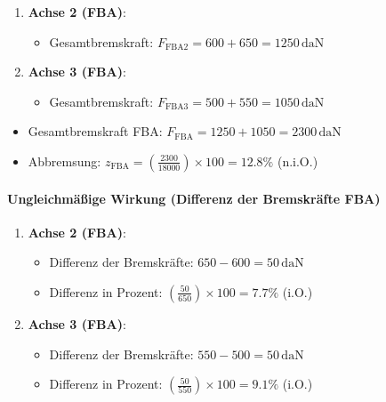 \documentclass{vorlage-design-main}
\begin{document}
\begin{enumerate}
\def\labelenumi{\arabic{enumi}.}

\item
  \textbf{Achse 2 (FBA)}:

  \begin{itemize}

  \item
    Gesamtbremskraft:
    $F_{\text{FBA2}} = 600 + 650 = 1250 \, \text{daN}$
  \end{itemize}
\item
  \textbf{Achse 3 (FBA)}:

  \begin{itemize}

  \item
    Gesamtbremskraft:
    $F_{\text{FBA3}} = 500 + 550 = 1050 \, \text{daN}$
  \end{itemize}
\end{enumerate}

\begin{itemize}

\item
  Gesamtbremskraft FBA:
  $F_{\text{FBA}} = 1250 + 1050 = 2300 \, \text{daN}$
\item
  Abbremsung:
  $z_{\text{FBA}} = \left( \frac{2300}{18000} \right) \times 100 = 12.8\%$
  (n.i.O.)
\end{itemize}

\paragraph{Ungleichmäßige Wirkung (Differenz der Bremskräfte
FBA)}\label{ungleichmaessige-wirkung-differenz-der-bremskraefte-fba}

\begin{enumerate}
\def\labelenumi{\arabic{enumi}.}

\item
  \textbf{Achse 2 (FBA)}:

  \begin{itemize}

  \item
    Differenz der Bremskräfte: $650 - 600 = 50 \, \text{daN}$
  \item
    Differenz in Prozent:
    $\left( \frac{50}{650} \right) \times 100 = 7.7\%$ (i.O.)
  \end{itemize}
\item
  \textbf{Achse 3 (FBA)}:

  \begin{itemize}

  \item
    Differenz der Bremskräfte: $550 - 500 = 50 \, \text{daN}$
  \item
    Differenz in Prozent:
    $\left( \frac{50}{550} \right) \times 100 = 9.1\%$ (i.O.)
  \end{itemize}
\end{enumerate}
\end{document}
